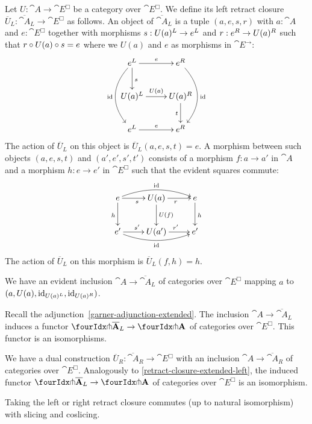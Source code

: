 \documentclass[reqno,10pt,a4paper,oneside]{amsart}
\begin{document}
Let $U : \cat{A} \to \cat{E}^{\Box}$ be a category over $\cat{E}^{\Box}$.
We define its left retract closure $\overline{U}_L : \overline{\cat{A}}_L \to \cat{E}^{\Box}$ as follows.
An object of $\overline{\cat{A}}_L$ is a tuple $(a, e, s, r)$ with $a : \cat{A}$ and $e : \cat{E}^{\Box}$ together with morphisms $s : U(a){}^L \to e{}^L$ and $r : e{}^R \to U(a){}^R$ such that $r \mathbin{\circ} U(a) \mathbin{\circ} s = e$ where we $U(a)$ and $e$ as morphisms in $\cat{E}^{\to}$:
\[
\xymatrix{
  e\sql
  \ar[r]^{e}
  \ar[d]^{s}
  \ar@/_2em/[dd]_{\id}
&
  e\sqr
  \ar@/^2em/[dd]^{\id}
\\
  U(a)\sql
  \ar[r]^{U(a)}
&
  U(a)\sqr
  \ar[d]_{t}
\\
  e\sql
  \ar[r]^{e}
&
  e\sqr
}
\]
The action of $\overline{U}_L$ on this object is $\overline{U}_L(a, e, s, t) = e$.
A morphism between such objects $(a, e, s, t)$ and $(a', e', s', t')$ consists of a morphism $f : a \to a'$ in $\cat{A}$ and a morphism $h : e \to e'$ in $\cat{E}^{\Box}$ such that the evident squares commute:
\[
\xymatrix{
  e
  \ar[r]_{s}
  \ar@/^1em/[rr]^{\id}
  \ar[d]_{h}
&
  U(a)
  \ar[r]_{r}
  \ar[d]^{U(f)}
&
  e
  \ar[d]^{h}
\\
  e'
  \ar[r]^{s'}
  \ar@/_1em/[rr]_{\id}
&
  U(a')
  \ar[r]^{r'}
&
  e'
}
\]
The action of $\overline{U}_L$ on this morphism is $\overline{U}_L(f, h) = h$.

We have an evident inclusion $\cat{A} \to \overline{\cat{A}}_L$ of categories over $\cat{E}^{\Box}$ mapping $a$ to $(a, U(a), \operatorname{id}_{U(a){}^L}, \operatorname{id}_{U(a){}^R})$.

\begin{lemma}
\label{retract-closure-extended-left}
Recall the adjunction~\eqref{garner-adjunction-extended}.
The inclusion $\cat{A} \to \overline{\cat{A}}_L$ induces a functor $\liftr{\overline{\cat{A}}_L} \to \liftr{\cat{A}}$ of categories over $\cat{E}^{\Box}$.
This functor is an isomorphisms.
\end{lemma}

\begin{remark}
\label{retract-closure-extended-right}
We have a dual construction $\overline{U}_R : \overline{\cat{A}}_R \to \cat{E}^{\Box}$ with an inclusion $\cat{A} \to \overline{\cat{A}}_R$ of categories over $\cat{E}^{\Box}$.
Analogously to \cref{retract-closure-extended-left}, the induced functor $\liftl{\overline{\cat{A}}_L} \to{} \liftl{\cat{A}}$ of categories over $\cat{E}^{\Box}$ is an isomorphism.
\end{remark}

\begin{remark}
\label{retract-closure-extended-slicing}
Taking the left or right retract closure commutes (up to natural isomorphism) with slicing and coslicing.
\end{remark}
\end{document}
